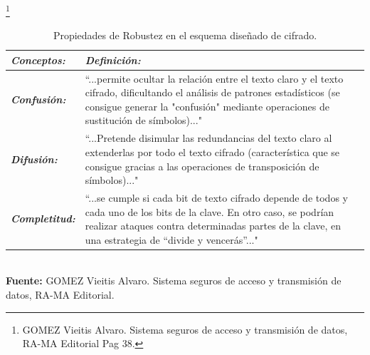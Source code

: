 \documentclass[a4paper,openright,12pt]{book}
\theoremstyle{definition}
\theoremstyle{remark}
\begin{document}
\begin{table}[ht]
\centering
\caption{Propiedades de Robustez en el esquema diseñado de cifrado.}\footnote{GOMEZ Vieitis Alvaro. Sistema seguros de acceso y transmisión de datos, RA-MA Editorial Pag 38.}
\begin{tabular}{>{\centering\arraybackslash}m{3cm} >{\arraybackslash}m{10cm} }
\hline
\textbf{\textit{Conceptos:}} & \textbf{\textit{Definición:}} \\ \hline
\textbf{\textit{Confusión:}} & “...permite ocultar la relación entre el texto claro y el texto cifrado, dificultando el análisis de patrones estadísticos (se consigue generar la "confusión" mediante operaciones de sustitución de símbolos)..." \\ \hline
\textbf{\textit{Difusión:}} & “...Pretende disimular las redundancias del texto claro al extenderlas por todo el texto cifrado (característica que se consigue gracias a las operaciones de transposición de símbolos)..." \\ \hline
\textbf{\textit{Completitud:}} & “...se cumple si cada bit de texto cifrado depende de todos y cada uno de los bits de la clave. En otro caso, se podrían realizar ataques contra determinadas partes de la clave, en una estrategia de “divide y vencerás”..." \\ \hline
\end{tabular}
\label{tabla:RobustezPropiedades}
\\\textbf{Fuente:} GOMEZ Vieitis Alvaro. Sistema seguros de acceso y transmisión de datos, RA-MA Editorial.
\end{table}
\end{document}
